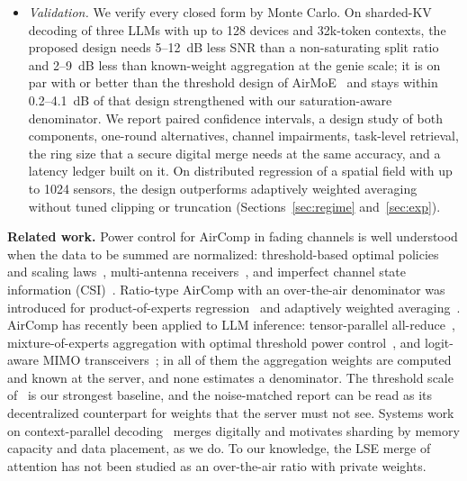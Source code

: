 \begin{itemize}
\item \emph{Validation.} We verify every closed form by Monte Carlo. On sharded-KV decoding of three LLMs with up to 128 devices and 32k-token contexts, the proposed design needs 5--12~dB less SNR than a non-saturating split ratio and 2--9~dB less than known-weight aggregation at the genie scale; it is on par with or better than the threshold design of AirMoE~\cite{yang2026airmoe} and stays within 0.2--4.1~dB of that design strengthened with our saturation-aware denominator. We report paired confidence intervals, a design study of both components, one-round alternatives, channel impairments, task-level retrieval, the ring size that a secure digital merge needs at the same accuracy, and a latency ledger built on it. On distributed regression of a spatial field with up to 1024 sensors, the design outperforms adaptively weighted averaging~\cite{sato2026awa} without tuned clipping or truncation (Sections~\ref{sec:regime} and~\ref{sec:exp}).
\end{itemize}

\textbf{Related work.} Power control for AirComp in fading channels is well understood when the data to be summed are normalized: threshold-based optimal policies and scaling laws~\cite{cao2020power,liu2020scaling}, multi-antenna receivers~\cite{zhu2019mimo,chen2024view}, and imperfect channel state information (CSI)~\cite{evgenidis2024imperfect}. Ratio-type AirComp with an over-the-air denominator was introduced for product-of-experts regression~\cite{sato2022gpr} and adaptively weighted averaging~\cite{sato2026awa}. AirComp has recently been applied to LLM inference: tensor-parallel all-reduce~\cite{zhang2025jstsp}, mixture-of-experts aggregation with optimal threshold power control~\cite{yang2026airmoe}, and logit-aware MIMO transceivers~\cite{zhang2026logit}; in all of them the aggregation weights are computed and known at the server, and none estimates a denominator. The threshold scale of~\cite{yang2026airmoe} is our strongest baseline, and the noise-matched report can be read as its decentralized counterpart for weights that the server must not see. Systems work on context-parallel decoding~\cite{lin2024infinite,acharya2025star,bhatia2025helix,shyam2024tree,meta2025cp} merges digitally and motivates sharding by memory capacity and data placement, as we do. To our knowledge, the LSE merge of attention has not been studied as an over-the-air ratio with private weights.
